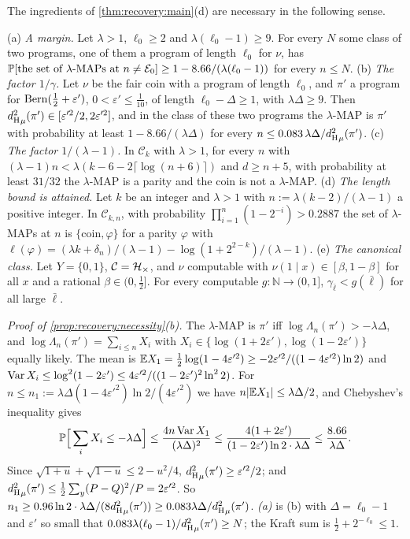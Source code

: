 The ingredients of \cref{thm:recovery:main}(d) are necessary in the following sense.

\begin{proposition}\label{prop:recovery:necessity}
(a) \emph{A margin.} Let $\lambda>1$, $\ell_0\ge2$ and $\lambda(\ell_0-1)\ge9$. For every $N$ some class of two programs, one of them a program of length $\ell_0$ for $\nu$, has $\mathbb{P}[\text{the set of $\lambda$-MAPs at $n$}\ne\mathcal E_0]\ge1-8.66/(\lambda(\ell_0-1))$ for every $n\le N$.
(b) \emph{The factor $1/\gamma$.} Let $\nu$ be the fair coin with a program of length $\ell_0$, and $\pi'$ a program for $\operatorname{Bern}(\frac12+\varepsilon')$, $0<\varepsilon'\le\frac1{10}$, of length $\ell_0-\Delta\ge1$, with $\lambda\Delta\ge9$. Then ${d_{\mathrm{H}}^{2}}_\mu(\pi')\in[\varepsilon'^2/2,2\varepsilon'^2]$, and in the class of these two programs the $\lambda$-MAP is $\pi'$ with probability at least $1-8.66/(\lambda\Delta)$ for every $n\le0.083\,\lambda\Delta/{d_{\mathrm{H}}^{2}}_\mu(\pi')$.
(c) \emph{The factor $1/(\lambda-1)$.} In $\mathcal C_k$ with $\lambda>1$, for every $n$ with $(\lambda-1)n<\lambda(k-6-2\lceil\log(n+6)\rceil)$ and $d\ge n+5$, with probability at least $31/32$ the $\lambda$-MAP is a parity and the coin is not a $\lambda$-MAP.
(d) \emph{The length bound is attained.} Let $k$ be an integer and $\lambda>1$ with $n:=\lambda(k-2)/(\lambda-1)$ a positive integer. In $\mathcal C_{k,n}$, with probability $\prod_{i=1}^n(1-2^{-i})>0.2887$ the set of $\lambda$-MAPs at $n$ is $\{\text{coin},\varphi\}$ for a parity $\varphi$ with $\ell(\varphi)=(\lambda k+\delta_n)/(\lambda-1)-\log(1+2^{2-k})/(\lambda-1)$.
(e) \emph{The canonical class.} Let $Y=\{0,1\}$, $\mathcal C=\mathcal{H}_{\times}$, and $\nu$ computable with $\nu(1\mid x)\in[\beta,1-\beta]$ for all $x$ and a rational $\beta\in(0,\frac12]$. For every computable $g:\mathbb N\to(0,1]$, $\gamma_{\bar\ell}<g(\bar\ell)$ for all large $\bar\ell$.
\end{proposition}

\emph{Proof of \cref{prop:recovery:necessity}(b).} The $\lambda$-MAP is $\pi'$ iff $\log\Lambda_n(\pi')>-\lambda\Delta$, and $\log\Lambda_n(\pi')=\sum_{i\le n}X_i$ with $X_i\in\{\log(1+2\varepsilon'),\log(1-2\varepsilon')\}$ equally likely. The mean is $\mathbb{E} X_1=\frac12\log(1-4\varepsilon'^2)\ge-2\varepsilon'^2/((1-4\varepsilon'^2)\ln2)$ and $\operatorname{Var} X_i\le\log^2(1-2\varepsilon')\le4\varepsilon'^2/((1-2\varepsilon')^2\ln^22)$. For $n\le n_1:=\lambda\Delta(1-4\varepsilon'^2)\ln2/(4\varepsilon'^2)$ we have $n|\mathbb{E} X_1|\le\lambda\Delta/2$, and Chebyshev's inequality gives
\[
\mathbb{P}\Big[\sum_iX_i\le-\lambda\Delta\Big]\le\frac{4n\operatorname{Var} X_1}{(\lambda\Delta)^2}\le\frac{4(1+2\varepsilon')}{(1-2\varepsilon')\ln2\cdot\lambda\Delta}\le\frac{8.66}{\lambda\Delta}.
\]
Since $\sqrt{1+u}+\sqrt{1-u}\le2-u^2/4$, ${d_{\mathrm{H}}^{2}}_\mu(\pi')\ge\varepsilon'^2/2$; and ${d_{\mathrm{H}}^{2}}_\mu(\pi')\le\frac12\sum_y(P-Q)^2/P=2\varepsilon'^2$. So $n_1\ge0.96\ln2\cdot\lambda\Delta/(8{d_{\mathrm{H}}^{2}}_\mu(\pi'))\ge0.083\lambda\Delta/{d_{\mathrm{H}}^{2}}_\mu(\pi')$. \emph{(a)} is (b) with $\Delta=\ell_0-1$ and $\varepsilon'$ so small that $0.083\lambda(\ell_0-1)/{d_{\mathrm{H}}^{2}}_\mu(\pi')\ge N$; the Kraft sum is $\frac12+2^{-\ell_0}\le1$.

